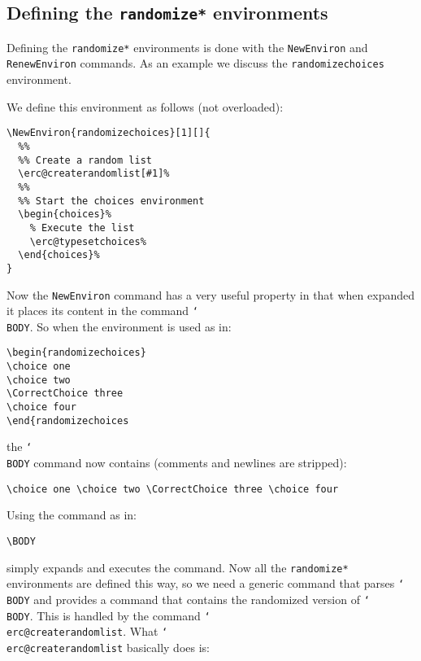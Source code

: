 \documentclass[12pt,a4paper]{exam}
\providecommand{\texorpdfstring}[2]{#1}
\newcommand{\bs}{\texorpdfstring{\char`\\}{}}
\begin{document}
\subsection{Defining the \texttt{randomize*} environments}
Defining the \texttt{randomize*} environments is done with the \texttt{NewEnviron}
and \texttt{RenewEnviron} commands. As an example we discuss the
\texttt{randomizechoices} environment.

We define this environment as follows (not overloaded):

\begin{lstlisting}
\NewEnviron{randomizechoices}[1][]{
  %%
  %% Create a random list
  \erc@createrandomlist[#1]%
  %%
  %% Start the choices environment
  \begin{choices}%
    % Execute the list
    \erc@typesetchoices%
  \end{choices}%
}
\end{lstlisting}

Now the \texttt{NewEnviron} command has a very useful property in that
when expanded it places its content in the command \texttt{\bs BODY}.
So when the environment is used as in:

\begin{lstlisting}
\begin{randomizechoices}
\choice one
\choice two
\CorrectChoice three
\choice four
\end{randomizechoices
\end{lstlisting}

the \texttt{\bs BODY} command now contains (comments and newlines are stripped):

\begin{lstlisting}
\choice one \choice two \CorrectChoice three \choice four
\end{lstlisting}

Using the command as in:
\begin{lstlisting}
\BODY
\end{lstlisting}

simply expands and executes the command. Now all the \texttt{randomize*} environments
are defined this way, so we need a generic command that parses \texttt{\bs BODY} and
provides a command that contains the randomized version of \texttt{\bs BODY}. This is
handled by the command \texttt{\bs erc@createrandomlist}. What \texttt{\bs erc@createrandomlist}
basically does is:
\end{document}
